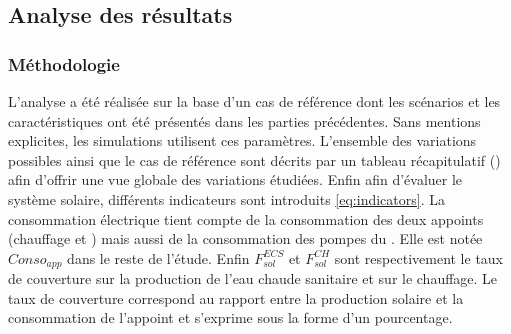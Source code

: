 \subsection{Analyse des résultats} %
\label{sub:analyse_des_resultats}
\subsubsection{Méthodologie} %
\label{ssub:methodologie}
L’analyse a été réalisée sur la base d’un cas de référence dont les scénarios et les
caractéristiques ont été présentés dans les parties précédentes. Sans mentions explicites, les
simulations utilisent ces paramètres. L’ensemble des variations possibles ainsi que
le cas de référence sont décrits par un tableau récapitulatif ()
afin d’offrir une vue globale des variations étudiées.
Enfin afin d’évaluer le système solaire, différents indicateurs sont introduits
\eqref{eq:indicators}. La consommation électrique tient compte de la consommation des deux
appoints (chauffage et ) mais aussi de la consommation des pompes du . Elle est
notée $Conso_{app}$ dans le reste de l’étude. Enfin $F_{sol}^{ECS}$ et $F_{sol}^{CH}$
sont respectivement le taux de couverture sur la production de l’eau chaude sanitaire
et sur le chauffage. Le taux de couverture correspond au rapport entre la production
solaire et la consommation de l’appoint et s’exprime sous la forme d’un pourcentage.


